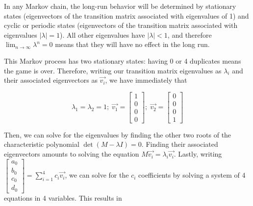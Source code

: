 \documentclass[11pt]{article} %
\begin{document}
In any Markov chain, the long-run behavior will be determined by stationary states (eigenvectors of the transition matrix
associated with eigenvalues of 1) and cyclic or periodic states (eigenvectors of the transition matrix associated with eigenvalues
$|\lambda| = 1$). All other eigenvalues have $|\lambda| < 1$, and therefore $\lim_{n \to \infty} \lambda^n = 0$ means that
they will have no effect in the long run.

This Markov process has two stationary states: having 0 or 4 duplicates means the game is over. Therefore, writing our
transition matrix eigenvalues as $\lambda_i$ and their associated eigenvectors as $\vec{v_i}$, we have immediately
that

$$\lambda_1 = \lambda_2 = 1; \; \vec{v_1} = \begin{bmatrix} 1 \\ 0 \\ 0 \\ 0 \end{bmatrix}; \; \vec{v_2} =
\begin{bmatrix} 0 \\ 0 \\ 0 \\ 1 \end{bmatrix}$$

Then, we can solve for the
eigenvalues by finding the other two roots of the characteristic polynomial $\operatorname{det} (M - \lambda I) = 0$. Finding their
associated eigenvectors amounts to solving the equation $M\vec{v_i} = \lambda_i \vec{v_i}$. Lastly, writing
$\begin{bmatrix} a_0 \\ b_0 \\ c_0 \\ d_0 \end{bmatrix} = \sum_{i=1}^4 c_i \vec{v_i}$, we can solve for the $c_i$
coefficients by solving a system of 4 equations in 4 variables. This results in
\end{document}
